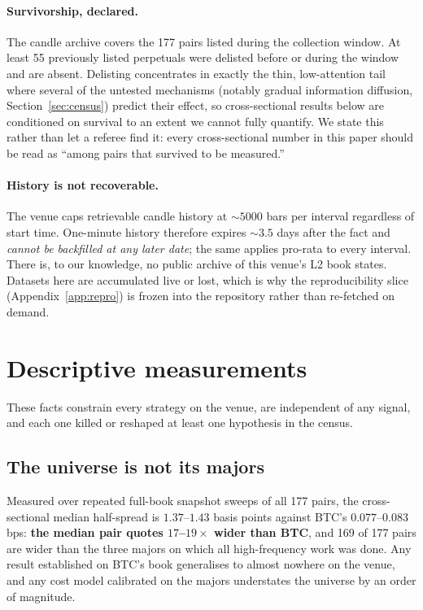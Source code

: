 \documentclass[11pt,a4paper]{article}
\begin{document}
\paragraph{Survivorship, declared.} The candle archive covers the 177
pairs listed during the collection window. At least 55 previously
listed perpetuals were delisted before or during the window and are
absent. Delisting concentrates in exactly the thin, low-attention tail
where several of the untested mechanisms (notably gradual information
diffusion, Section~\ref{sec:census}) predict their effect, so
cross-sectional results below are conditioned on survival to an extent
we cannot fully quantify. We state this rather than let a referee find
it: every cross-sectional number in this paper should be read as
``among pairs that survived to be measured.''

\paragraph{History is not recoverable.} The venue caps retrievable
candle history at ${\sim}5000$ bars per interval regardless of start
time. One-minute history therefore expires ${\sim}3.5$ days after the
fact and \emph{cannot be backfilled at any later date}; the same
applies pro-rata to every interval. There is, to our knowledge, no
public archive of this venue's L2 book states. Datasets here are
accumulated live or lost, which is why the reproducibility slice
(Appendix~\ref{app:repro}) is frozen into the repository rather than
re-fetched on demand.

\section{Descriptive measurements}
\label{sec:venue}

These facts constrain every strategy on the venue, are independent of
any signal, and each one killed or reshaped at least one hypothesis in
the census.

\subsection{The universe is not its majors}
\label{sec:venue:spread}

Measured over repeated full-book snapshot sweeps of all 177 pairs, the
cross-sectional median half-spread is $1.37$--$1.43$ basis points
against BTC's $0.077$--$0.083$\,bps: \textbf{the median pair quotes
$17$--$19\times$ wider than BTC}, and 169 of 177 pairs are wider than
the three majors on which all high-frequency work was done. Any result
established on BTC's book generalises to almost nowhere on the venue,
and any cost model calibrated on the majors understates the universe by
an order of magnitude.
\end{document}
